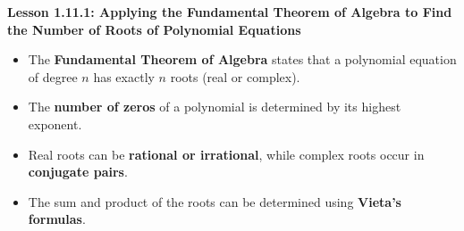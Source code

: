 \begin{center}
\textbf{Lesson 1.11.1: Applying the Fundamental Theorem of Algebra to Find the Number of Roots of Polynomial Equations}
\end{center}

\vspace*{-1.5ex}

\begin{itemize}
    \item The \textbf{Fundamental Theorem of Algebra} states that a polynomial equation of degree \( n \) has exactly \( n \) roots (real or complex).
    \item The \textbf{number of zeros} of a polynomial is determined by its highest exponent.
    \item Real roots can be \textbf{rational or irrational}, while complex roots occur in \textbf{conjugate pairs}.
    \item The sum and product of the roots can be determined using \textbf{Vieta’s formulas}.
\end{itemize}